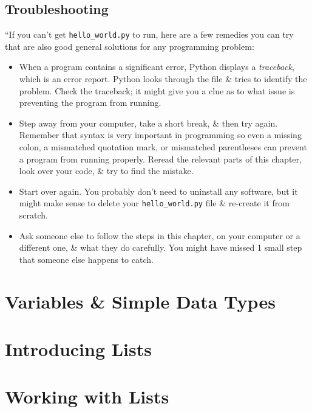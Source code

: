 \documentclass[oneside]{book}
\numberwithin{equation}{section}
\begin{document}
\subsection{Troubleshooting}
``If you can't get \verb|hello_world.py| to run, here are a few remedies you can try that are also good general solutions for any programming problem:
\begin{itemize}
	\item When a program contains a significant error, Python displays a \textit{traceback}, which is an error report. Python looks through the file \& tries to identify the problem. Check the traceback; it might give you a clue as to what issue is preventing the program from running.
	\item Step away from your computer, take a short break, \& then try again. Remember that syntax is very important in programming so even a missing colon, a mismatched quotation mark, or mismatched parentheses can prevent a program from running properly. Reread the relevant parts of this chapter, look over your code, \& try to find the mistake.
	\item Start over again. You probably don't need to uninstall any software, but it might make sense to delete your \verb|hello_world.py| file \& re-create it from scratch.
	\item Ask someone else to follow the steps in this chapter, on your computer or a different one, \& what they do carefully. You might have missed 1 small step that someone else happens to catch.
\end{itemize}


\section{Variables \& Simple Data Types}


\section{Introducing Lists}


\section{Working with Lists}
\end{document}

